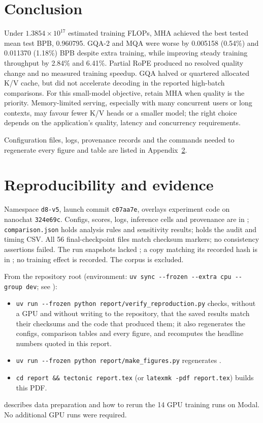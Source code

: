 \documentclass[10pt,twocolumn]{article}
\begin{document}
\section{Conclusion}
Under $1.3854\times10^{17}$ estimated training FLOPs, MHA achieved the best tested mean test BPB, 0.960795.
GQA-2 and MQA were worse by 0.005158 (0.54\%) and 0.011370 (1.18\%) BPB despite extra training, while improving
steady training throughput by 2.84\% and 6.41\%. Partial RoPE produced no resolved quality change and no measured
training speedup. GQA halved or quartered allocated K/V cache, but did not accelerate decoding in the reported
high-batch comparisons. For this small-model objective, retain MHA when quality is the priority. Memory-limited
serving, especially with many concurrent users or long contexts, may favour fewer K/V heads or a smaller model;
the right choice depends on the application's quality, latency and concurrency requirements.

Configuration files, logs, provenance records and the commands needed to regenerate every figure and table are
listed in Appendix~\ref{app:repro}.

%
%
{\footnotesize
\setlength{\bibsep}{1.5pt plus 0.5pt}


}

\appendix
\section{Reproducibility and evidence}\label{app:repro}
Namespace \texttt{d8-v5}, launch commit \texttt{c07aa7e}, overlays experiment code on nanochat \texttt{324e69c}.
Configs, scores, logs, inference cells and provenance are in ;
\texttt{comparison.json} holds analysis rules and sensitivity results;  holds the audit
and timing CSV. All 56 final-checkpoint files match checksum markers; no consistency assertions failed.
The run snapshots lacked ; a copy matching its recorded hash is in ; no training effect is recorded.
The corpus is excluded.

From the repository root (environment: \texttt{uv sync -{}-frozen -{}-extra cpu -{}-group dev}; see ):
\begin{itemize}\small
\item \texttt{uv run -{}-frozen python report/verify\_reproduction.py} checks, without a GPU and without writing to the
repository, that the saved results match their checksums and the code that produced them; it also regenerates the
configs, comparison tables and every figure, and recomputes the headline numbers quoted in this report.
\item \texttt{uv run -{}-frozen python report/make\_figures.py} regenerates .
\item \texttt{cd report \&\& tectonic report.tex} (or \texttt{latexmk -pdf report.tex}) builds this PDF.
\end{itemize}
 describes data preparation and how to rerun the 14 GPU training runs on Modal.
No additional GPU runs were required.
\end{document}
